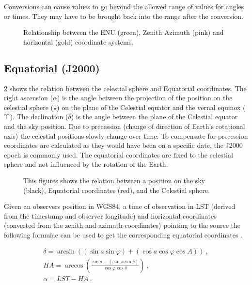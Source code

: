 Conversions can cause values to go beyond the allowed range of values
for angles or times. They may have to be brought back into the range
after the conversion.

\begin{figure}
    \centering
    
    \caption{Relationship between the ENU (green), Zenith Azimuth (pink)
             and horizontal (gold) coordinate systems.}
    \label{fig:enu_zenazi_horizontal}
\end{figure}


\subsection{Equatorial (J2000)}

\cref{fig:equatorial} shows the relation between the celestial sphere
and Equatorial coordinates. The right ascension ($\alpha$) is the angle
between the projection of the position on the celestial sphere ($\star$)
on the plane of the Celestial equator and the vernal equinox
($\vernal$). The declination ($\delta$) is the angle between the plane
of the Celestial equator and the sky position. Due to precession (change
of direction of Earth's rotational axis) the celestial positions slowly
change over time. To compensate for precession coordinates are
calculated as they would have been on a specific date, the J2000 epoch
is commonly used. The equatorial coordinates are fixed to the celestial
sphere and not influenced by the rotation of the Earth.

\begin{figure}
    \centering
    
    \caption{This figures shows the relation between a position on the
             sky (black), Equatorial coordinates (red), and the
             Celestial sphere.}
    \label{fig:equatorial}
\end{figure}

Given an observers position in WGS84, a time of observation in LST
(derived from the \gps timestamp and observer longitude) and horizontal
coordinates (converted from the zenith and azimuth coordinates) pointing
to the source the following formulae can be used to get the
corresponding equatorial coordinates \cite[p. 37]{duffet-smith:1990aa}.

\begin{equation}
    \label{eq:equatorial}
    \begin{array}{l}
        \delta = \arcsin{\left((\sin{a} \sin{\varphi}) +
                               (\cos{a} \cos{\varphi} \cos{A})\right)} \ , \\
        \mathit{HA} = \arccos{\left(\frac{\sin{a} - (\sin{\varphi} \sin{\delta})}
                                         {\cos{\varphi} \cos{\delta}}\right)} \ , \\
        \alpha = \mathit{LST} - \mathit{HA} \ .
    \end{array}
\end{equation}


